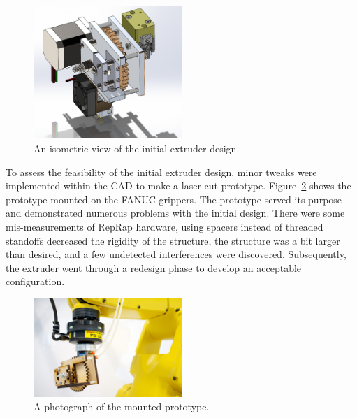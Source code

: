 \begin{figure}[h!]
\centering
\includegraphics[width=0.5\textwidth]{./figures/extruder-old-2}
\caption{An isometric view of the initial extruder design.}
\label{fig:old extruder}
\end{figure}

To assess the feasibility of the initial extruder design, minor tweaks were implemented within the CAD to make a laser-cut prototype.  Figure~\ref{fig:prototype extruder} shows the prototype mounted on the FANUC grippers. The prototype served its purpose and demonstrated numerous problems with the initial design. There were some mis-measurements of RepRap hardware, using spacers instead of threaded standoffs decreased the rigidity of the structure, the structure was a bit larger than desired, and a few undetected interferences were discovered. Subsequently, the extruder went through a redesign phase to develop an acceptable configuration.\\

\begin{figure}[h!]
\centering
\includegraphics[width=0.5\textwidth]{./figures/extruder-prototype-2}
\caption{A photograph of the mounted prototype.}
\label{fig:prototype extruder}
\end{figure}

